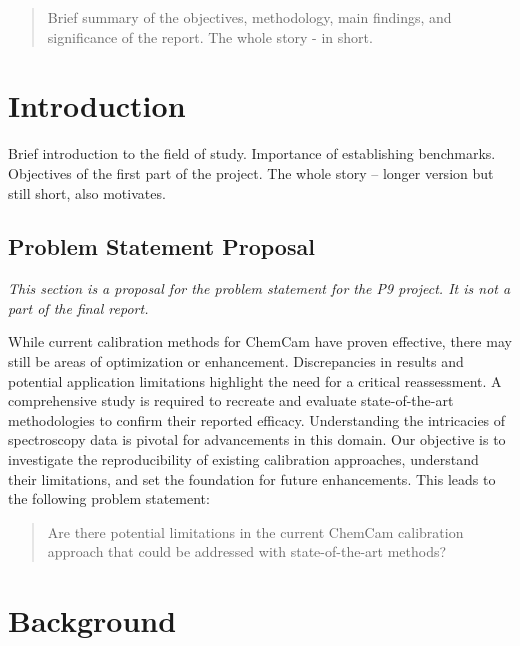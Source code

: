 \begin{abstract}
     Brief summary of the objectives, methodology, main findings, and significance of the report. The whole story - in short.
\end{abstract}



\section{Introduction}
Brief introduction to the field of study.
Importance of establishing benchmarks.
Objectives of the first part of the project.
The whole story – longer version but still short, also motivates.

\subsection{Problem Statement Proposal}
\textit{This section is a proposal for the problem statement for the P9 project. It is not a part of the final report.}

\vspace{0.5cm}
\noindent
While current calibration methods for ChemCam have proven effective, there may still be areas of optimization or enhancement.
Discrepancies in results and potential application limitations highlight the need for a critical reassessment.
A comprehensive study is required to recreate and evaluate state-of-the-art methodologies to confirm their reported efficacy.
Understanding the intricacies of spectroscopy data is pivotal for advancements in this domain.
Our objective is to investigate the reproducibility of existing calibration approaches, understand their limitations, and set the foundation for future enhancements.
\noindent
This leads to the following problem statement:

\begin{quote}
    Are there potential limitations in the current ChemCam calibration approach that could be addressed with state-of-the-art methods?
\end{quote}

\section{Background}

